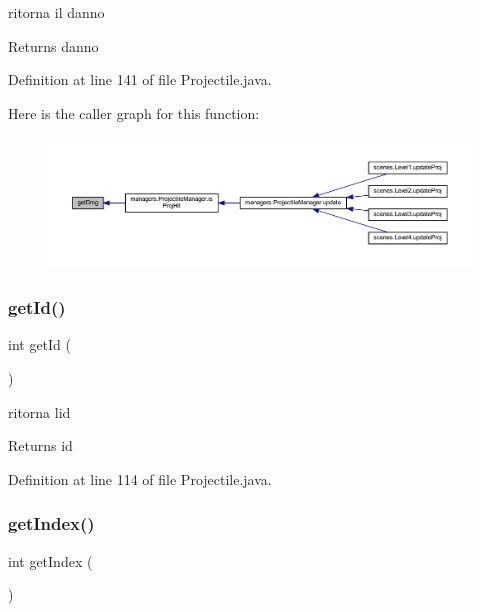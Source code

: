 ritorna il danno 

\begin{DoxyReturn}{Returns}
danno 
\end{DoxyReturn}


Definition at line 141 of file Projectile.\+java.

Here is the caller graph for this function\+:\nopagebreak
\begin{figure}[H]
\begin{center}
\leavevmode
\includegraphics[width=350pt]{classobjects_1_1_projectile_a3eb7b7894f5f3b1409005aecd00a38ad_icgraph}
\end{center}
\end{figure}
\mbox{\label{classobjects_1_1_projectile_a67283be3f45257d1e0c474c563ebb6b6}} 
\subsubsection{\texorpdfstring{get\+Id()}{getId()}}
{\footnotesize\ttfamily int get\+Id (\begin{DoxyParamCaption}{ }\end{DoxyParamCaption})}



ritorna l\textquotesingle{}id 

\begin{DoxyReturn}{Returns}
id 
\end{DoxyReturn}


Definition at line 114 of file Projectile.\+java.

\mbox{\label{classobjects_1_1_projectile_a59d053c950ff1e9f8a004d493f34e754}} 
\subsubsection{\texorpdfstring{get\+Index()}{getIndex()}}
{\footnotesize\ttfamily int get\+Index (\begin{DoxyParamCaption}{ }\end{DoxyParamCaption})}



